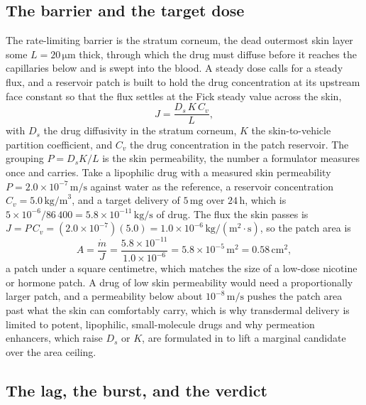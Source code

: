 \subsection*{The barrier and the target dose}

The rate-limiting barrier is the stratum corneum, the dead outermost skin layer
some $L = 20\,\si{\micro\meter}$ thick, through which the drug must diffuse
before it reaches the capillaries below and is swept into the blood. A steady
dose calls for a steady flux, and a reservoir patch is built to hold the drug
concentration at its upstream face constant so that the flux settles at the
Fick steady value across the skin,
\[
J = \frac{D_s\,K\,C_v}{L},
\]
with $D_s$ the drug diffusivity in the stratum corneum, $K$ the
skin-to-vehicle partition coefficient, and $C_v$ the drug concentration in the
patch reservoir. The grouping $P = D_s K/L$ is the skin permeability, the
number a formulator measures once and carries. Take a lipophilic drug with a
measured skin permeability $P = 2.0\times 10^{-7}\,\text{m/s}$ against water
as the reference, a reservoir concentration $C_v = 5.0\,\text{kg/m}^3$, and a
target delivery of $5\,\text{mg}$ over $24\,\text{h}$, which is
$5\times 10^{-6}/86\,400 = 5.8\times 10^{-11}\,\text{kg/s}$ of drug. The flux
the skin passes is $J = P\,C_v = (2.0\times 10^{-7})(5.0) = 1.0\times 10^{-6}\,
\text{kg}/(\text{m}^2\cdot\text{s})$, so the patch area is
\[
A = \frac{\dot m}{J} = \frac{5.8\times 10^{-11}}{1.0\times 10^{-6}} =
5.8\times 10^{-5}\,\text{m}^2 = 0.58\,\text{cm}^2,
\]
a patch under a square centimetre, which matches the size of a
low-dose nicotine or hormone patch. A drug of low skin permeability would need
a proportionally larger patch, and a permeability below about $10^{-8}\,
\text{m/s}$ pushes the patch area past what the skin can comfortably carry,
which is why transdermal delivery is limited to potent, lipophilic,
small-molecule drugs and why permeation enhancers, which raise $D_s$ or $K$,
are formulated in to lift a marginal candidate over the area ceiling.

\subsection*{The lag, the burst, and the verdict}


